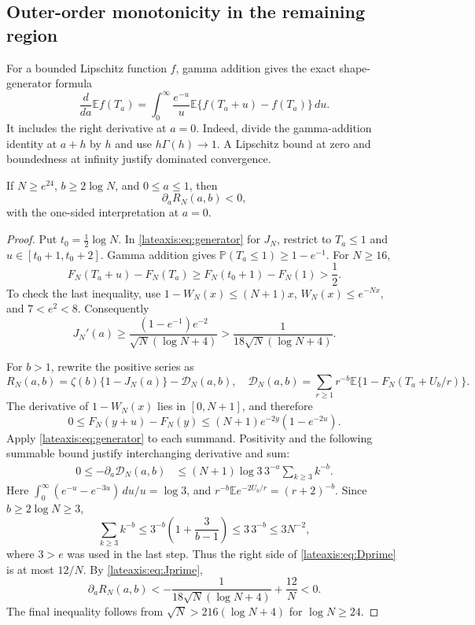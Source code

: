 \subsection{Outer-order monotonicity in the remaining region}

For a bounded Lipschitz function $f$, gamma addition gives the exact
shape-generator formula
\begin{equation}\label{lateaxis:eq:generator}
 \frac{d}{da}\mathbb E f(T_a)
 =\int_0^\infty\frac{e^{-u}}u
             \mathbb E\{f(T_a+u)-f(T_a)\}\,du.
\end{equation}
It includes the right derivative at $a=0$.  Indeed, divide the
gamma-addition identity at $a+h$ by $h$ and use
$h\Gamma(h)\to1$.  A Lipschitz bound at zero and boundedness at
infinity justify dominated convergence.

\begin{lemma}
\label{lateaxis:lem:outer}
If $N\ge e^{24}$, $b\ge2\log N$, and $0\le a\le1$, then
\[
 \partial_a R_N(a,b)<0,
\]
with the one-sided interpretation at $a=0$.
\end{lemma}
\begin{proof}
Put $t_0=\frac12\log N$.  In \eqref{lateaxis:eq:generator} for
$J_N$, restrict to $T_a\le1$ and $u\in[t_0+1,t_0+2]$.
Gamma addition gives $\mathbb P(T_a\le1)\ge1-e^{-1}$.  For $N\ge16$,
\[
 F_N(T_a+u)-F_N(T_a)
 \ge F_N(t_0+1)-F_N(1)>\frac12.
\]
To check the last inequality, use
$1-W_N(x)\le(N+1)x$, $W_N(x)\le e^{-Nx}$, and $7<e^2<8$.
Consequently
\begin{equation}\label{lateaxis:eq:Jprime}
 J_N'(a)\ge
 \frac{(1-e^{-1})e^{-2}}{\sqrt N(\log N+4)}
 >\frac{1}{18\sqrt N(\log N+4)}.
\end{equation}

For $b>1$, rewrite the positive series as
\[
 R_N(a,b)=\zeta(b)\{1-J_N(a)\}-\mathcal D_N(a,b),
 \quad
 \mathcal D_N(a,b)=\sum_{r\ge1}r^{-b}
       \mathbb E\{1-F_N(T_a+U_b/r)\}.
\]
The derivative of $1-W_N(x)$ lies in $[0,N+1]$, and therefore
\[
 0\le F_N(y+u)-F_N(y)
 \le(N+1)e^{-2y}(1-e^{-2u}).
\]
Apply \eqref{lateaxis:eq:generator} to each summand.  Positivity and
the following summable bound justify interchanging derivative and sum:
\begin{align}
 0\le-\partial_a\mathcal D_N(a,b)
 &\le (N+1)\log3\,3^{-a}\sum_{k\ge3}k^{-b}.
 \label{lateaxis:eq:Dprime}
\end{align}
Here $\int_0^\infty(e^{-u}-e^{-3u})\,du/u=\log3$, and
$r^{-b}\mathbb E e^{-2U_b/r}=(r+2)^{-b}$.
Since $b\ge2\log N\ge3$,
\[
 \sum_{k\ge3}k^{-b}\le3^{-b}\left(1+\frac3{b-1}\right)
 \le3\,3^{-b}\le3N^{-2},
\]
where $3>e$ was used in the last step.  Thus the right side of
\eqref{lateaxis:eq:Dprime} is at most $12/N$.
By \eqref{lateaxis:eq:Jprime},
\[
 \partial_a R_N(a,b)
 <-\frac1{18\sqrt N(\log N+4)}+\frac{12}{N}<0.
\]
The final inequality follows from
$\sqrt N>216(\log N+4)$ for $\log N\ge24$.
\end{proof}

